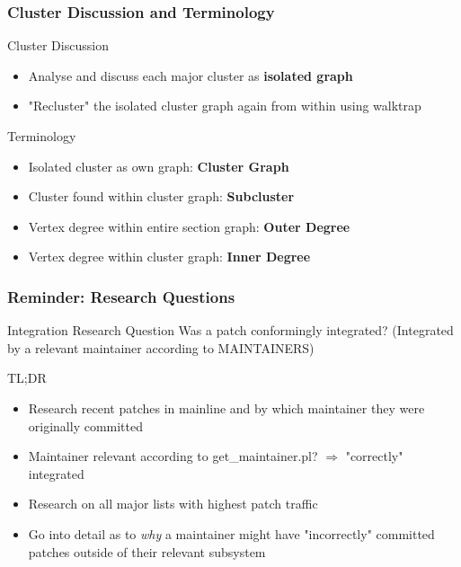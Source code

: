 \documentclass{beamer}
\begin{document}
	\begin{frame}
	\frametitle{Cluster Discussion and Terminology}
		\begin{alertblock}{Cluster Discussion}
			\begin{itemize}
				\item Analyse and discuss each major cluster as \textbf{isolated graph}
				\item "Recluster" the isolated cluster graph again from within using walktrap
			\end{itemize}
		\end{alertblock}
		
		\begin{block}{Terminology}
			\begin{itemize}
				\item Isolated cluster as own graph: \textbf{Cluster Graph}
				\item Cluster found within cluster graph: \textbf{Subcluster}
				\item Vertex degree within entire section graph: \textbf{Outer Degree}
				\item Vertex degree within cluster graph: \textbf{Inner Degree}
			\end{itemize}
		\end{block}
	\end{frame}



	\begin{frame}
	\frametitle{Reminder: Research Questions}
		\begin{alertblock}{Integration Research Question}
		Was a patch conformingly integrated? (Integrated by a relevant maintainer according to MAINTAINERS)
		\end{alertblock}

		\begin{block}{TL;DR}
			\begin{itemize}
				\item Research recent patches in mainline and by which maintainer they were originally committed
				\item Maintainer relevant according to get\_maintainer.pl? $\Rightarrow$ "correctly" integrated
				\item Research on all major lists with highest patch traffic
				\item Go into detail as to \textit{why} a maintainer might have "incorrectly" committed patches outside of their relevant subsystem
			\end{itemize}
		\end{block}
	\end{frame}
\end{document}
